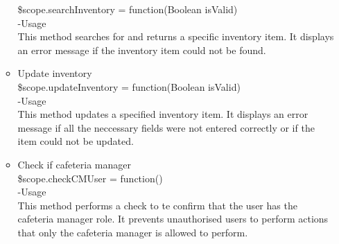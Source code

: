 \documentclass[a4paper,12pt]{article}
\begin{document}
\begin{enumerate}
\begin{itemize}
     \$scope.searchInventory = function(Boolean isValid)\\
     -Usage\\
     This method searches for and returns a specific inventory item. It displays an error message if the inventory item could not be found.
     \item Update inventory\\
      \$scope.updateInventory = function(Boolean isValid)\\
      -Usage\\
      This method updates a specified inventory item. It displays an error message if all the neccessary fields were not entered correctly or if the item could not be updated.
      \item Check if cafeteria manager\\
       \$scope.checkCMUser = function()\\
       -Usage\\
       This method performs a check to te confirm that the user has the cafeteria manager role. It prevents unauthorised users to perform actions that only the cafeteria manager is allowed to perform.
	\end{itemize}
\end{enumerate}
\end{document}
